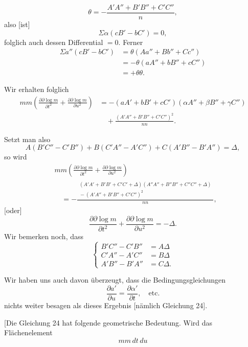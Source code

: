 %
\[
\theta=-\frac{A'A''+B'B''+C'C''}{n},
\]
also [ist]
\[
\Sigma\alpha(cB'-bC')=0,
\]
folglich auch dessen Differential $=0$. Ferner
\[
\begin{aligned}
\Sigma a''(cB'-bC')&=\theta(Aa''+Bb''+Cc'')\\
&=-\theta(aA''+bB''+cC'')\\
&=+\theta\theta.
\end{aligned}
\]
\par\indent Wir erhalten folglich
\[
\begin{aligned}
mm\left(\frac{\partial\partial\log m}{\partial t^2}+\frac{\partial\partial\log m}{\partial u^2}\right)
&=-(aA'+bB'+cC')(\alpha A''+\beta B''+\gamma C'')\\
&\quad+\frac{(A'A''+B'B''+C'C'')^2}{nn}.
\end{aligned}
\]
\par\indent Setzt man also
\[
A(B'C''-C'B'')+B(C'A''-A'C'')+C(A'B''-B'A'')=\Delta,
\]
so wird
\[
\begin{aligned}
&mm\left(\frac{\partial\partial\log m}{\partial t^2}+\frac{\partial\partial\log m}{\partial u^2}\right)\\
&\quad=-\frac{\begin{gathered}(A'A'+B'B'+C'C'+\Delta)(A''A''+B''B''+C''C''+\Delta)\\[-2pt]{}-(A'A''+B'B''+C'C'')^2\end{gathered}}{nn},
\end{aligned}
\]
[oder]
\begin{equation}\tag*{[24]}
\frac{\partial\partial\log m}{\partial t^2}+\frac{\partial\partial\log m}{\partial u^2}=-\Delta.
\end{equation}
Wir bemerken noch, dass
\begin{equation}\tag*{$(\FourRingCross)$}
\left\{\begin{aligned}
B'C''-C'B''&=A\Delta\\
C'A''-A'C''&=B\Delta\\
A'B''-B'A''&=C\Delta.
\end{aligned}\right.
\end{equation}
\par\indent Wir haben uns auch davon überzeugt, dass die Bedingungsgleichungen
\[
\frac{\partial a'}{\partial u}=\frac{\partial\alpha'}{\partial t},\quad\text{etc.}
\]
nichts weiter besagen als dieses Ergebnis [nämlich Gleichung 24].

[Die Gleichung 24 hat folgende geometrische Bedeutung. Wird das Flächenelement
\[
mm\,dt\,du
\]
